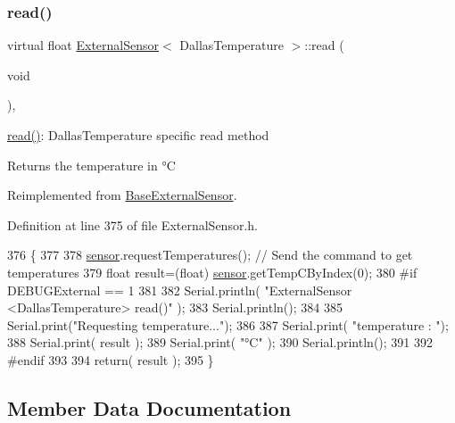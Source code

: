 \subsubsection{\texorpdfstring{read()}{read()}}
{\footnotesize\ttfamily virtual float \hyperlink{class_external_sensor}{External\+Sensor}$<$ Dallas\+Temperature $>$\+::read (\begin{DoxyParamCaption}\item[{void}]{ }\end{DoxyParamCaption})\hspace{0.3cm}{\ttfamily [inline]}, {\ttfamily [virtual]}}

\hyperlink{class_external_sensor_3_01_dallas_temperature_01_4_a1e725d9338314515d4e5dc456ed6a6c8}{read()}\+: Dallas\+Temperature specific read method

\begin{DoxyReturn}{Returns}
the temperature in °C 
\end{DoxyReturn}


Reimplemented from \hyperlink{class_base_external_sensor_a1564f16deacf57b51b9948ac29db4291}{Base\+External\+Sensor}.



Definition at line 375 of file External\+Sensor.\+h.


\begin{DoxyCode}
376     \{
377 
378         \hyperlink{class_external_sensor_3_01_dallas_temperature_01_4_adb6ba4fcdedef95ad8f6b0c9b6c0f9d1}{sensor}.requestTemperatures(); \textcolor{comment}{// Send the command to get temperatures}
379         \textcolor{keywordtype}{float} result=(float) \hyperlink{class_external_sensor_3_01_dallas_temperature_01_4_adb6ba4fcdedef95ad8f6b0c9b6c0f9d1}{sensor}.getTempCByIndex(0);
380 \textcolor{preprocessor}{    #if DEBUGExternal == 1 }
381 
382         Serial.println( \textcolor{stringliteral}{"ExternalSensor <DallasTemperature> read()"} );
383         Serial.println();
384 
385         Serial.print(\textcolor{stringliteral}{"Requesting temperature..."});
386 
387         Serial.print( \textcolor{stringliteral}{"temperature : "});
388         Serial.print( result );
389         Serial.print( \textcolor{stringliteral}{"°C"} );
390         Serial.println();
391     
392 \textcolor{preprocessor}{    #endif}
393         
394         \textcolor{keywordflow}{return}( result );
395     \}
\end{DoxyCode}


\subsection{Member Data Documentation}
\mbox{\label{class_external_sensor_3_01_dallas_temperature_01_4_a7d9e9d2893e453638fcf440e5d8d9082}} 
